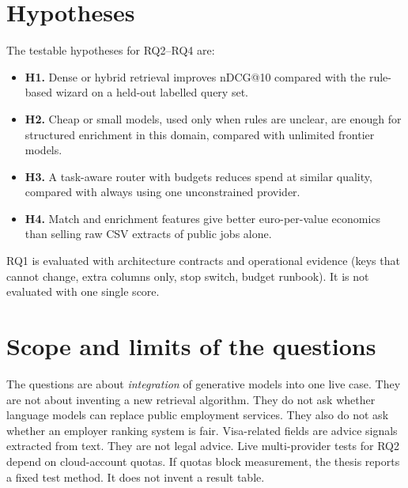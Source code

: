 \section{Hypotheses}
\label{sec:hypotheses}

The testable hypotheses for RQ2--RQ4 are:

\begin{itemize}
  \item \textbf{H1.} Dense or hybrid retrieval improves nDCG@10 compared with the rule-based wizard on a held-out labelled query set.
  \item \textbf{H2.} Cheap or small models, used only when rules are unclear, are enough for structured enrichment in this domain, compared with unlimited frontier models.
  \item \textbf{H3.} A task-aware router with budgets reduces spend at similar quality, compared with always using one unconstrained provider.
  \item \textbf{H4.} Match and enrichment features give better euro-per-value economics than selling raw CSV extracts of public jobs alone.
\end{itemize}

RQ1 is evaluated with architecture contracts and operational evidence (keys that cannot change, extra columns only, stop switch, budget runbook). It is not evaluated with one single score.

\section{Scope and limits of the questions}
\label{sec:rq-scope}

The questions are about \emph{integration} of generative models into one live case. They are not about inventing a new retrieval algorithm. They do not ask whether language models can replace public employment services. They also do not ask whether an employer ranking system is fair. Visa-related fields are advice signals extracted from text. They are not legal advice. Live multi-provider tests for RQ2 depend on cloud-account quotas. If quotas block measurement, the thesis reports a fixed test method. It does not invent a result table.
